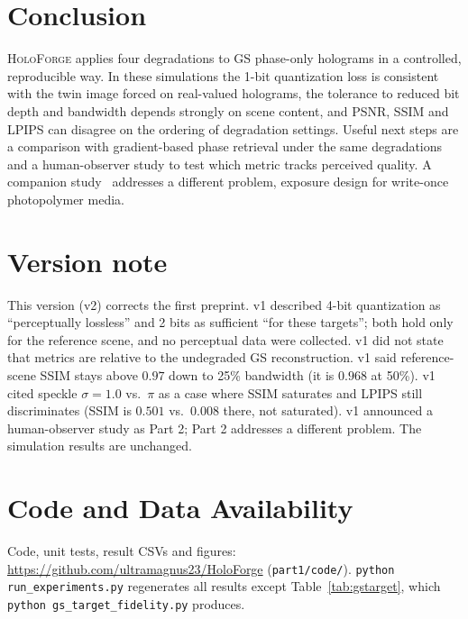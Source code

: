 \documentclass[conference]{IEEEtran}
\begin{document}
\section{Conclusion}
\label{sec:conclusion}
\textsc{HoloForge} applies four degradations to GS phase-only holograms in a
controlled, reproducible way. In these simulations the 1-bit quantization
loss is consistent with the twin image forced on real-valued holograms, the
tolerance to reduced bit depth and bandwidth depends strongly on scene
content, and PSNR, SSIM and LPIPS can disagree on the ordering of degradation
settings. Useful next steps are a comparison with gradient-based phase
retrieval under the same degradations and a human-observer study to test
which metric tracks perceived quality. A companion study~\cite{tripathi2026mil}
addresses a different problem, exposure design for write-once photopolymer
media.

\section*{Version note}
This version (v2) corrects the first preprint. v1 described 4-bit quantization
as ``perceptually lossless'' and 2 bits as sufficient ``for these targets'';
both hold only for the reference scene, and no perceptual data were collected.
v1 did not state that metrics are relative to the undegraded GS
reconstruction. v1 said reference-scene SSIM stays above $0.97$ down to 25\%
bandwidth (it is $0.968$ at 50\%). v1 cited speckle $\sigma=1.0$ vs.\ $\pi$ as
a case where SSIM saturates and LPIPS still discriminates (SSIM is $0.501$ vs.\
$0.008$ there, not saturated). v1 announced a human-observer study as Part 2;
Part 2 addresses a different problem. The simulation results are unchanged.

\section*{Code and Data Availability}
Code, unit tests, result CSVs and figures:
\url{https://github.com/ultramagnus23/HoloForge} (\texttt{part1/code/}).
\texttt{python run\_experiments.py} regenerates all results except
Table~\ref{tab:gstarget}, which \texttt{python gs\_target\_fidelity.py}
produces.
\end{document}
